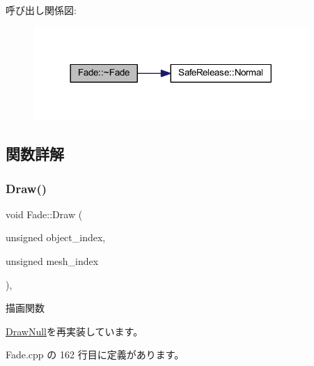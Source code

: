 呼び出し関係図\+:\nopagebreak
\begin{figure}[H]
\begin{center}
\leavevmode
\includegraphics[width=296pt]{class_fade_a58ddf7585cb85bf84f5e83adbe2734f9_cgraph}
\end{center}
\end{figure}


\subsection{関数詳解}
\mbox{\label{class_fade_a84a9e688650ac500e03cde74ff0210b8}} 
\subsubsection{\texorpdfstring{Draw()}{Draw()}}
{\footnotesize\ttfamily void Fade\+::\+Draw (\begin{DoxyParamCaption}\item[{unsigned}]{object\+\_\+index,  }\item[{unsigned}]{mesh\+\_\+index }\end{DoxyParamCaption})\hspace{0.3cm}{\ttfamily [override]}, {\ttfamily [virtual]}}



描画関数 



\mbox{\hyperlink{class_draw_null_afe50f6fd820b18d673f70f048743f339}{Draw\+Null}}を再実装しています。



 Fade.\+cpp の 162 行目に定義があります。

